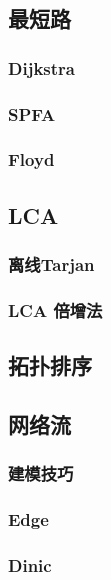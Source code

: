 \documentclass[twocolumn,a4]{article}%
\begin{document}
\subsection{最短路}
    \subsubsection{Dijkstra}
    
    \subsubsection{SPFA}
    
    \subsubsection{Floyd}
    
\subsection{LCA}
    \subsubsection{离线Tarjan}
    
    \subsubsection{LCA 倍增法}
    
\subsection{拓扑排序}

\subsection{网络流}
    \subsubsection{建模技巧}
    
    \subsubsection{Edge}
    
    \subsubsection{Dinic}
    
\end{document}
